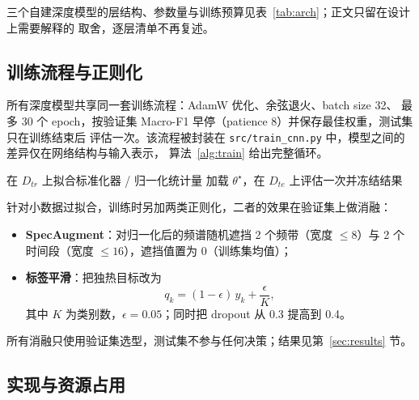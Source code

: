 \documentclass[UTF8,10pt,a4paper]{ctexart}
\begin{document}
三个自建深度模型的层结构、参数量与训练预算见表~\ref{tab:arch}；正文只留在设计上需要解释的
取舍，逐层清单不再复述。



\subsection{训练流程与正则化}

所有深度模型共享同一套训练流程：AdamW\cite{loshchilov2019adamw} 优化、余弦退火、batch size 32、
最多 30 个 epoch，按验证集 Macro-F1 早停（patience 8）并保存最佳权重，测试集只在训练结束后
评估一次。该流程被封装在 \texttt{src/train\_cnn.py} 中，模型之间的差异仅在网络结构与输入表示，
算法~\ref{alg:train} 给出完整循环。

\begin{algorithm}[H]
\caption{统一训练与评估流程}\label{alg:train}
在 $D_{tr}$ 上拟合标准化器 / 归一化统计量\;
加载 $\theta^\star$，在 $D_{te}$ 上评估一次并冻结结果\;
\end{algorithm}

针对小数据过拟合，训练时另加两类正则化，二者的效果在验证集上做消融：
\begin{itemize}
  \item \textbf{SpecAugment}\cite{park2019specaugment}：对归一化后的频谱随机遮挡 2 个频带（宽度 $\le 8$）与 2 个时间段（宽度 $\le 16$），遮挡值置为 0（训练集均值）；
  \item \textbf{标签平滑}\cite{szegedy2016labelsmoothing}：把独热目标改为
  \begin{equation}
    q_k=(1-\epsilon)\,y_k+\frac{\epsilon}{K},
  \end{equation}
  其中 $K$ 为类别数，$\epsilon=0.05$；同时把 dropout 从 0.3 提高到 0.4。
\end{itemize}
所有消融只使用验证集选型，测试集不参与任何决策；结果见第~\ref{sec:results} 节。

\subsection{实现与资源占用}
\end{document}
